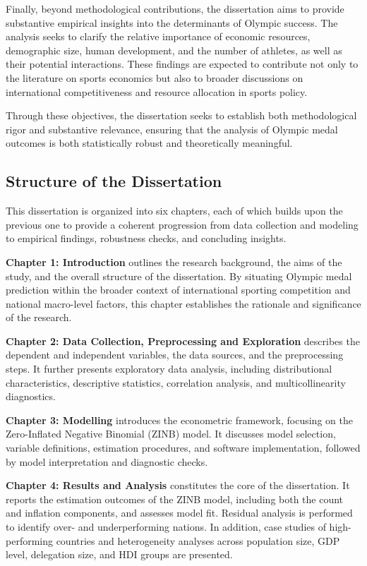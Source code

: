 \documentclass[11pt,twoside]{article}
\numberwithin{Theorem}{section}
\numberwithin{Definition}{section}
\numberwithin{Lemma}{section}
\numberwithin{Algorithm}{section}
\numberwithin{equation}{section}
\begin{document}
Finally, beyond methodological contributions, the dissertation aims to provide substantive empirical insights into the determinants of Olympic success. The analysis seeks to clarify the relative importance of economic resources, demographic size, human development, and the number of athletes, as well as their potential interactions. These findings are expected to contribute not only to the literature on sports economics but also to broader discussions on international competitiveness and resource allocation in sports policy.  

Through these objectives, the dissertation seeks to establish both methodological rigor and substantive relevance, ensuring that the analysis of Olympic medal outcomes is both statistically robust and theoretically meaningful.



\subsection{Structure of the Dissertation}

This dissertation is organized into six chapters, each of which builds upon the previous one to provide a coherent progression from data collection and modeling to empirical findings, robustness checks, and concluding insights.

\textbf{Chapter 1: Introduction} outlines the research background, the aims of the study, and the overall structure of the dissertation. By situating Olympic medal prediction within the broader context of international sporting competition and national macro-level factors, this chapter establishes the rationale and significance of the research.  

\textbf{Chapter 2: Data Collection, Preprocessing and Exploration} describes the dependent and independent variables, the data sources, and the preprocessing steps. It further presents exploratory data analysis, including distributional characteristics, descriptive statistics, correlation analysis, and multicollinearity diagnostics.  

\textbf{Chapter 3: Modelling} introduces the econometric framework, focusing on the Zero-Inflated Negative Binomial (ZINB) model. It discusses model selection, variable definitions, estimation procedures, and software implementation, followed by model interpretation and diagnostic checks.  

\textbf{Chapter 4: Results and Analysis} constitutes the core of the dissertation. It reports the estimation outcomes of the ZINB model, including both the count and inflation components, and assesses model fit. Residual analysis is performed to identify over- and underperforming nations. In addition, case studies of high-performing countries and heterogeneity analyses across population size, GDP level, delegation size, and HDI groups are presented.  
\end{document}
